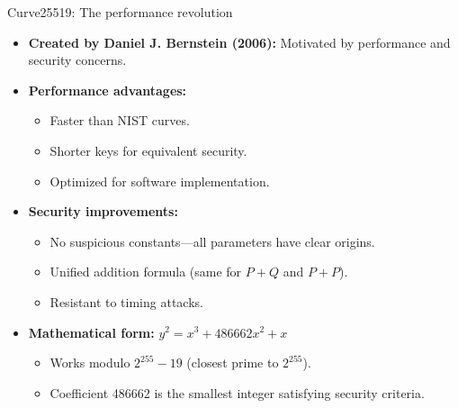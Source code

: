 \documentclass[aspectratio=169, lualatex, handout]{beamer}
\begin{document}
\begin{frame}{Curve25519: The performance revolution}
	\begin{itemize}
		\item \textbf{Created by Daniel J. Bernstein (2006):} Motivated by performance and security concerns.
		\item \textbf{Performance advantages:}
		      \begin{itemize}
			      \item Faster than NIST curves.
			      \item Shorter keys for equivalent security.
			      \item Optimized for software implementation.
		      \end{itemize}
		\item \textbf{Security improvements:}
		      \begin{itemize}
			      \item No suspicious constants—all parameters have clear origins.
			      \item Unified addition formula (same for $P + Q$ and $P + P$).
			      \item Resistant to timing attacks.
		      \end{itemize}
		\item \textbf{Mathematical form:} $y^2 = x^3 + 486662x^2 + x$
		      \begin{itemize}
			      \item Works modulo $2^{255} - 19$ (closest prime to $2^{255}$).
			      \item Coefficient 486662 is the smallest integer satisfying security criteria.
		      \end{itemize}
	\end{itemize}
\end{frame}
\end{document}
